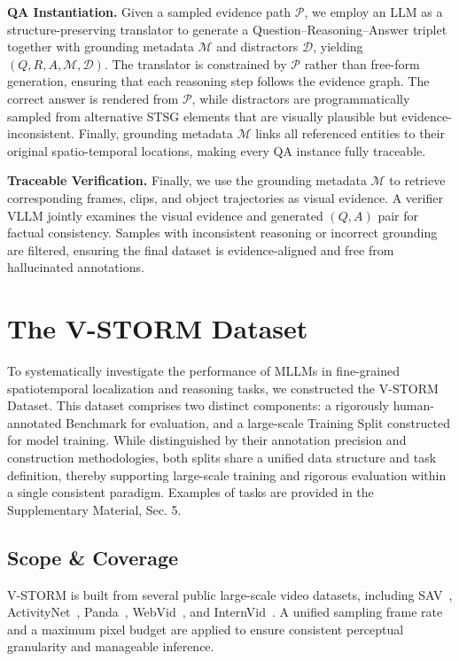 \documentclass[letterpaper]{article} %
\begin{document}
\noindent\textbf{QA Instantiation.}
Given a sampled evidence path $\mathcal{P}$, we employ an LLM as a structure-preserving translator to generate a Question--Reasoning--Answer triplet together with grounding metadata $\mathcal{M}$ and distractors $\mathcal{D}$, yielding $(Q,R,A,\mathcal{M},\mathcal{D})$. The translator is constrained by $\mathcal{P}$ rather than free-form generation, ensuring that each reasoning step follows the evidence graph. The correct answer is rendered from $\mathcal{P}$, while distractors are programmatically sampled from alternative STSG elements that are visually plausible but evidence-inconsistent. Finally, grounding metadata $\mathcal{M}$ links all referenced entities to their original spatio-temporal locations, making every QA instance fully traceable.

\noindent\textbf{Traceable Verification.} Finally, we use the grounding metadata $\mathcal{M}$ to retrieve corresponding frames, clips, and object trajectories as visual evidence. A verifier VLLM jointly examines the visual evidence and generated $(Q, A)$ pair for factual consistency. Samples with inconsistent reasoning or incorrect grounding are filtered, ensuring the final dataset is evidence-aligned and free from hallucinated annotations. 

\section{The V-STORM Dataset}

To systematically investigate the performance of MLLMs in fine-grained spatiotemporal localization and reasoning tasks, we constructed the V-STORM Dataset. This dataset comprises two distinct components: a rigorously human-annotated Benchmark for evaluation, and a large-scale Training Split constructed for model training. While distinguished by their annotation precision and construction methodologies, both splits share a unified data structure and task definition, thereby supporting large-scale training and rigorous evaluation within a single consistent paradigm. Examples of tasks are provided in the Supplementary Material, Sec. 5.

\subsection{Scope \& Coverage}

V-STORM is built from several public large-scale video datasets, including SAV~\cite{ravi2024sam}, ActivityNet~\citep{yu2019activitynet}, Panda~\citep{wang2020panda}, WebVid~\citep{bain2021frozen}, and InternVid~\citep{wang2023internvid}. A unified sampling frame rate and a maximum pixel budget are applied to ensure consistent perceptual granularity and manageable inference.
\end{document}
